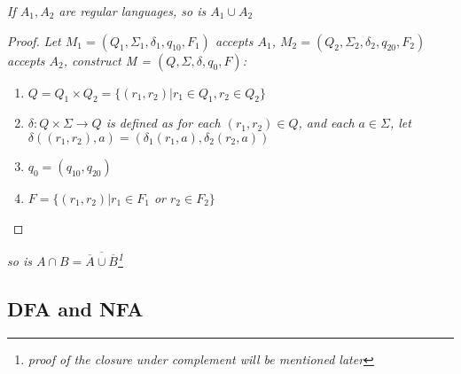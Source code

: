 \documentclass{article}
\begin{document}
\begin{thm}
    \textit{If $A_1,A_2$ are regular languages, so is $A_1\cup A_2$}

    \begin{proof}
        \textit{Let $M_1 = (Q_1,\Sigma_1,\delta_1,q_{10},F_1)$ accepts $A_1$, $M_2 = (Q_2,\Sigma_2,\delta_2,q_{20},F_2)$ accepts $A_2$, construct M = $(Q,\Sigma,\delta,q_0,F)$:}
        \begin{enumerate}
            \item $Q = Q_1\times Q_2 = \{(r_1,r_2)|r_1\in Q_1,r_2\in Q_2\}$
            \item \textit{$\delta:Q\times \Sigma \rightarrow Q$ is defined as for each $(r_1,r_2)\in Q$, and each $a \in \Sigma$, let $\delta ((r_1,r_2),a) = (\delta_1(r_1,a),\delta_2(r_2,a))$}
            \item $q_0 = (q_{10},q_{20})$
            \item \textit{$F = \{(r_1,r_2)|r_1\in F_1$ or $r_2\in F_2\}$}
        \end{enumerate}
    \end{proof}
    \begin{remark}
        \textit{so is $A\cap B = \overline{\overline{A}\cup\overline{B}}$\footnote{\textit{proof of the closure under complement will be mentioned later}}}
    \end{remark}
\end{thm}

\subsection{DFA and NFA}
\end{document}
